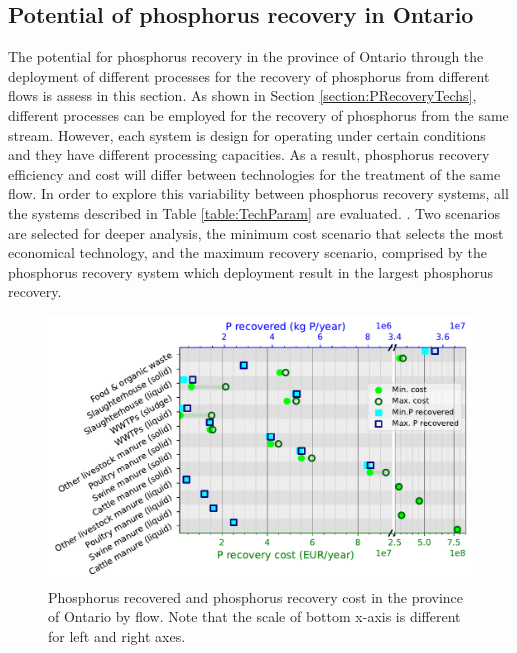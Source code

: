 \documentclass[authoryear]{elsarticle}
\begin{document}
\subsection{Potential of phosphorus recovery in Ontario}

The potential for phosphorus recovery in the province of Ontario through the  deployment of different processes for the recovery of phosphorus from different flows is assess in this section. As shown in Section \ref{section:PRecoveryTechs}, different processes can be employed for the recovery of phosphorus from the same stream. However, each system is design for operating under certain conditions and they have different processing capacities. As a result, phosphorus recovery efficiency and cost will differ between technologies for the treatment of the same flow. In order to explore this variability between phosphorus recovery systems, all the systems described in Table \ref{table:TechParam} are evaluated. {\color{red}{The results obtained in terms of phosphorus recovered and recovery cost for each technology and flow are collected in the Supplementary Material}}. Two scenarios are selected for deeper analysis, the minimum cost scenario that selects the most economical technology, and the maximum recovery scenario, comprised by the phosphorus recovery system which deployment result in the largest phosphorus recovery.

\begin{figure}[H]
	\centering
	\includegraphics[width=0.85\linewidth, trim={0cm 0cm 0cm 0cm},clip]{Figures/Results_PlotSummary.pdf} 
	\caption{Phosphorus recovered and phosphorus recovery cost in the province of Ontario by flow. Note that the scale of bottom x-axis is different for left and right axes.}
	\label{fig:Results_PlotSummary}
\end{figure}
\end{document}
